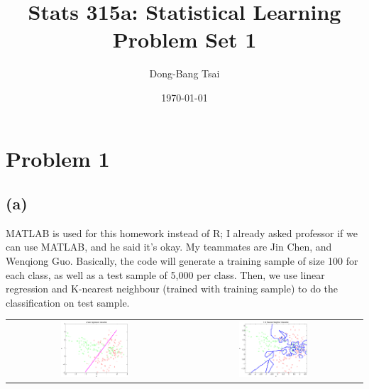 \documentclass[pra,groupedaddress,amsmath,amssymb, column]{revtex4}
\begin{document}
\title{Stats 315a: Statistical Learning \\ Problem Set 1}
\author{Dong-Bang Tsai}



\date{\today}
\maketitle


\section*{Problem 1}
\subsection*{(a)}
MATLAB is used for this homework instead of R; I already asked professor if we can use MATLAB, and he said it's okay. My teammates are Jin Chen, and Wenqiong Guo. Basically, the code will generate a training sample of size 100 for each class, as well as a test sample of 5,000 per class. Then, we use linear regression and K-nearest neighbour (trained with training sample) to do the classification on test sample.

\begin{tabular}{cc}
\includegraphics[width=0.4\textwidth]{Q1a1.pdf} &
\includegraphics[width=0.4\textwidth]{Q1a2.pdf}
\end{tabular}
\end{document}
